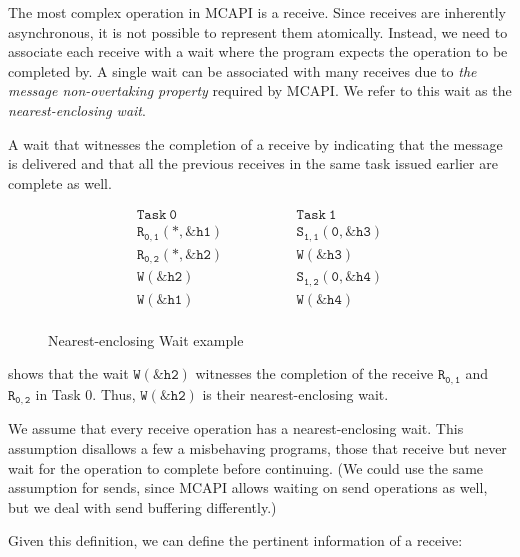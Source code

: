 The most complex operation in MCAPI is a receive. Since receives are
inherently asynchronous, it is not possible to represent them
atomically. Instead, we need to associate each receive with a wait
where the program expects the operation to be completed by. A single
wait can be associated with many receives due to \emph{the message
  non-overtaking property} required by MCAPI. We refer to this wait as
the \emph{nearest-enclosing wait}.

\begin{definition} \label{def:nw}
A wait that witnesses the completion of a receive by indicating that
the message is delivered and that all the previous receives in the
same task issued earlier are complete as well.
\end{definition}

\begin{figure}[h]
\[
\begin{array}{l|l}
\;\;\;\;\;\;\;\;\mathtt{Task\ 0}\;\;\;\;\;\;\;\; & \;\;\;\;\;\;\;\; \mathtt{Task\ 1}\;\;\;\;\;\;\;\; \\
\hline
\;\;\;\;\;\;\;\;\mathtt{R_{0,1}(*,\&h1)}\;\;\;\;\;\;\;\; & \;\;\;\;\;\;\;\; \mathtt{S_{1,1}(0,\&h3)}\;\;\;\;\;\;\;\; \\
\;\;\;\;\;\;\;\;\mathtt{R_{0,2}(*,\&h2)}\;\;\;\;\;\;\;\; & \;\;\;\;\;\;\;\; \mathtt{W{(\&h3)}}\;\;\;\;\;\;\;\; \\
\;\;\;\;\;\;\;\;\mathtt{W{(\&h2)}}\;\;\;\;\;\;\;\; & \;\;\;\;\;\;\;\; \mathtt{S_{1,2}(0,\&h4)}\;\;\;\;\;\;\;\; \\
\;\;\;\;\;\;\;\;\mathtt{W{(\&h1)}}\;\;\;\;\;\;\;\; & \;\;\;\;\;\;\;\; \mathtt{W{(\&h4)}}\;\;\;\;\;\;\;\; \\
\end{array}
\]
\caption{Nearest-enclosing Wait example} \label{fig:nw}
\end{figure}

 shows that the wait $\mathtt{W{(\&h2)}}$
witnesses the completion of the receive $\mathtt{R_{0,1}}$ and
$\mathtt{R_{0,2}}$ in Task 0. Thus, $\mathtt{W{(\&h2)}}$ is their
nearest-enclosing wait.

We assume that every receive operation has a nearest-enclosing
wait. This assumption disallows a few a misbehaving programs, those
that receive but never wait for the operation to complete before
continuing.  (We could use the same assumption for sends, since MCAPI
allows waiting on send operations as well, but we deal with send
buffering differently.)

Given this definition, we can define the pertinent information of a
receive:

